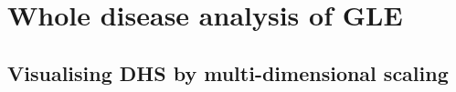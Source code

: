 \section{Whole disease analysis of GLE}\label{methods:gle}


\subsection{Visualising DHS by multi-dimensional scaling}\label{methods:encode_pca}





